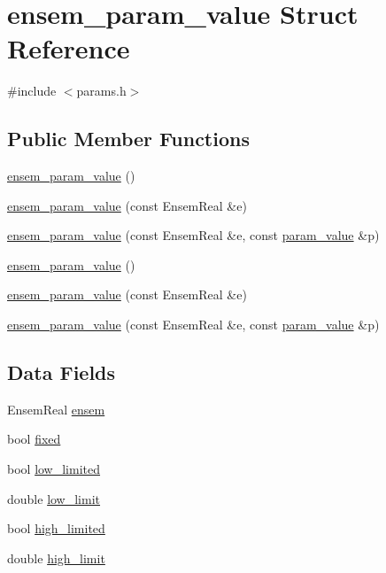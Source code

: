 \hypertarget{structensem__param__value}{}\section{ensem\+\_\+param\+\_\+value Struct Reference}
\label{structensem__param__value}


{\ttfamily \#include $<$params.\+h$>$}

\subsection*{Public Member Functions}
\begin{DoxyCompactItemize}
\item 
\mbox{\hyperlink{structensem__param__value_a9ca5f98de6960744498f119726683442}{ensem\+\_\+param\+\_\+value}} ()
\item 
\mbox{\hyperlink{structensem__param__value_aec91d15bf1b4a331ac913f0521aa6ef0}{ensem\+\_\+param\+\_\+value}} (const Ensem\+Real \&e)
\item 
\mbox{\hyperlink{structensem__param__value_ae8a7f36de536b55d0d511d6f6eca88a7}{ensem\+\_\+param\+\_\+value}} (const Ensem\+Real \&e, const \mbox{\hyperlink{structparam__value}{param\+\_\+value}} \&p)
\item 
\mbox{\hyperlink{structensem__param__value_a9ca5f98de6960744498f119726683442}{ensem\+\_\+param\+\_\+value}} ()
\item 
\mbox{\hyperlink{structensem__param__value_aec91d15bf1b4a331ac913f0521aa6ef0}{ensem\+\_\+param\+\_\+value}} (const Ensem\+Real \&e)
\item 
\mbox{\hyperlink{structensem__param__value_ae8a7f36de536b55d0d511d6f6eca88a7}{ensem\+\_\+param\+\_\+value}} (const Ensem\+Real \&e, const \mbox{\hyperlink{structparam__value}{param\+\_\+value}} \&p)
\end{DoxyCompactItemize}
\subsection*{Data Fields}
\begin{DoxyCompactItemize}
\item 
Ensem\+Real \mbox{\hyperlink{structensem__param__value_a6cfe7081a8c5612dac9577e0469d7f1a}{ensem}}
\item 
bool \mbox{\hyperlink{structensem__param__value_a56a12906a1ddedcda452cf5c677fd4c4}{fixed}}
\item 
bool \mbox{\hyperlink{structensem__param__value_af6f3a535dbfaef2c13add71d75154ca9}{low\+\_\+limited}}
\item 
double \mbox{\hyperlink{structensem__param__value_aeefb7c79eb7b747585833d8b40dea889}{low\+\_\+limit}}
\item 
bool \mbox{\hyperlink{structensem__param__value_afeca05b1049706d7d7442cf1155c5370}{high\+\_\+limited}}
\item 
double \mbox{\hyperlink{structensem__param__value_a7e7a91f8210e84f0b33db77cf35973ee}{high\+\_\+limit}}
\end{DoxyCompactItemize}


